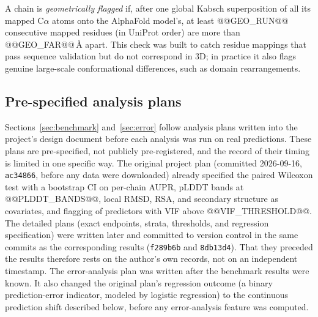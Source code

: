 \documentclass[10pt]{article}
\begin{document}
A chain is \emph{geometrically flagged} if, after one global Kabsch
superposition of all its mapped C$\alpha$ atoms onto the AlphaFold model's,
at least @@GEO_RUN@@ consecutive mapped residues (in UniProt order) are more
than @@GEO_FAR@@\,\r{A} apart. This check was built to catch residue
mappings that pass sequence validation but do not correspond in 3D; in
practice it also flags genuine large-scale conformational differences, such
as domain rearrangements.

\subsection{Pre-specified analysis plans}
\label{sec:prespec}

Sections~\ref{sec:benchmark} and~\ref{sec:error} follow analysis plans
written into the project's design document before each analysis was run on
real predictions. These plans are pre-specified, not publicly pre-registered,
and the record of their timing is limited in one specific way. The original
project plan (committed 2026-09-16, \texttt{ac34866}, before any data were
downloaded) already specified the paired Wilcoxon test with a bootstrap CI on
per-chain AUPR, pLDDT bands at @@PLDDT_BANDS@@, local RMSD, RSA, and
secondary structure as covariates, and flagging of predictors with VIF above
@@VIF_THRESHOLD@@. The detailed plans (exact endpoints, strata, thresholds,
and regression specification) were written later and committed to version
control in the same commits as the corresponding results (\texttt{f289b6b}
and \texttt{8db13d4}). That they preceded the results therefore rests on the
author's own records, not on an independent timestamp. The error-analysis
plan was written after the benchmark results were known. It also changed the
original plan's regression outcome (a binary prediction-error indicator,
modeled by logistic regression) to the continuous prediction shift described
below, before any error-analysis feature was computed.
\end{document}
